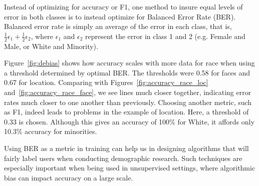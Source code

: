 Instead of optimizing for accuracy or F1, one method to insure equal levels of error in both classes is to instead optimize for Balanced Error Rate (BER).
Balanced error rate is simply an average of the error in each class, that is, 
$\frac{1}{2}\epsilon_1 + \frac{1}{2}\epsilon_2$, where $\epsilon_1$ and $\epsilon_2$ represent the error in class 1 and 2 (e.g. Female and Male, or White and Minority).

Figure~\ref{fig:debias} shows how accuracy scales with more data for race when using a threshold determined by optimal BER. 
The thresholds were 0.58 for faces and 0.67 for location.
Comparing with Figures~\ref{fig:accuracy_race_loc} and~\ref{fig:accuracy_race_face}, we see lines much closer together, indicating error rates much closer to one another than previously.
Choosing another metric, such as F1, indeed leads to problems in the example of location.
Here, a threshold of 0.33 is chosen.
Although this gives an accuracy of 100\% for White, it affords only 10.3\% accuracy for minorities.

Using BER as a metric in training can help us in designing algorithms that will fairly label users when conducting demographic research.
Such techniques are especially important when being used in unsupervised settings, where algorithmic bias can impact accuracy on a large scale.









